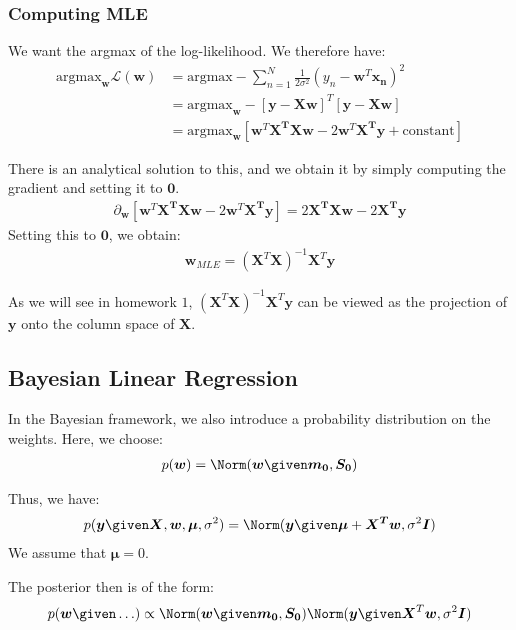 \documentclass{article}
\renewcommand{\v}{\boldsymbol}
\begin{document}
	\subsubsection{Computing MLE}
	We want the argmax of the log-likelihood. We therefore have:
		\begin{align*}
			\text{argmax}_{\v{w}} \mathcal{L}(\v{w}) &= \text{argmax} - \sum_{n=1}^N \frac{1}{2 \sigma^2} (y_n - \v{w}^T \v{x_n})^2 \\
			&= \text{argmax}_{\v{w}} -  \left[ \v{y} - \v{X} \v{w} \right]^T \left[ \v{y} - \v{X} \v{w} \right] \\
			&= \text{argmax}_{\v{w}} \left[ \v{w}^T \v{X^T} \v{X} \v{w} - 2 \v{w}^T \v{X^T} \v{y} + \text{constant} \right]			
		\end{align*}
		
		There is an analytical solution to this, and we obtain it by simply computing the gradient and setting it to $\v{0}$. 
		\begin{align*}
			\partial_{\v{w}} \left [\v{w}^T \v{X^T} \v{X} \v{w} - 2 \v{w}^T \v{X^T} \v{y} \right] = 2 \v{X^T} \v{X} \v{w} - 2 \v{X^T} \v{y}
		\end{align*}
		Setting this to $\v{0}$, we obtain:
		\begin{align*}
			\v{w}_{MLE} = (\v{X}^T \v{X})^{-1} \v{X}^T \v{y}
		\end{align*}			
		
		As we will see in homework $1$, $(\v{X}^T \v{X})^{-1} \v{X}^T \v{y}$ can be viewed as the projection of $\v{y}$ onto the column space of $\v{X}$.

\subsection{Bayesian Linear Regression}
In the Bayesian framework, we also introduce a probability distribution on the weights. Here, we choose:
	\begin{align*}
		p(\v{w}) = \Norm(\v{w} \given \v{m_0}, \v{S_0}) 
	\end{align*}
	
	Thus, we have:
	\begin{align*}
		p(\v{y} \given \v{X}, \v{w}, \v{\mu}, \sigma^2) = \Norm(\v{y} \given \v{\mu} + \v{X^T} \v{w}, \sigma^2 \v{I})
	\end{align*}
	We assume that $\v{\mu} = 0$.
	
The posterior then is of the form:
\begin{align*}
	p(\v{w} \given \ldots) \propto \Norm(\v{w} \given \v{m_0}, \v{S_0}) \Norm(\v{y} \given  \v{X}^T \v{w}, \sigma^2 \v{I})
\end{align*}
\end{document}
